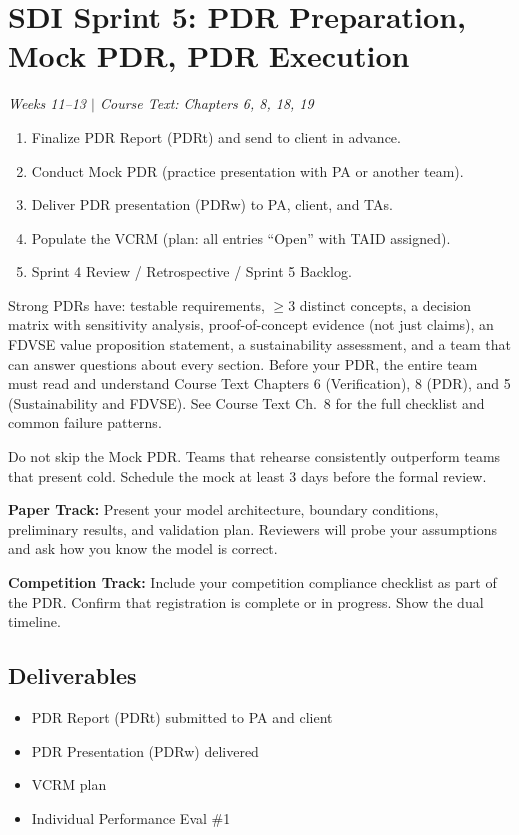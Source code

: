 \section{SDI Sprint 5: PDR Preparation, Mock PDR, PDR Execution}
\textit{Weeks 11--13 $|$ Course Text: Chapters 6, 8, 18, 19}

\begin{priorities}
\begin{enumerate}[nosep]
\item Finalize PDR Report (PDRt) and send to client in advance.
\item Conduct Mock PDR (practice presentation with PA or another team).
\item Deliver PDR presentation (PDRw) to PA, client, and TAs.
\item Populate the VCRM (plan: all entries ``Open'' with TAID assigned).
\item Sprint 4 Review / Retrospective / Sprint 5 Backlog.
\end{enumerate}
\end{priorities}

\begin{faqbox}
Strong PDRs have: testable requirements, $\geq$3 distinct concepts, a decision matrix with sensitivity analysis, proof-of-concept evidence (not just claims), an FDVSE value proposition statement, a sustainability assessment, and a team that can answer questions about every section. Before your PDR, the entire team must read and understand Course Text Chapters 6 (Verification), 8 (PDR), and 5 (Sustainability and FDVSE). See Course Text Ch.~8 for the full checklist and common failure patterns.
\end{faqbox}

\begin{warnbox}
Do not skip the Mock PDR. Teams that rehearse consistently outperform teams that present cold. Schedule the mock at least 3 days before the formal review.
\end{warnbox}

\begin{faqbox}
\textbf{Paper Track:} Present your model architecture, boundary conditions, preliminary results, and validation plan. Reviewers will probe your assumptions and ask how you know the model is correct.

\textbf{Competition Track:} Include your competition compliance checklist as part of the PDR. Confirm that registration is complete or in progress. Show the dual timeline.
\end{faqbox}

\subsection{Deliverables}
\begin{itemize}[nosep,leftmargin=1.5em]
\item PDR Report (PDRt) submitted to PA and client
\item PDR Presentation (PDRw) delivered
\item VCRM plan
\item Individual Performance Eval \#1
\end{itemize}


